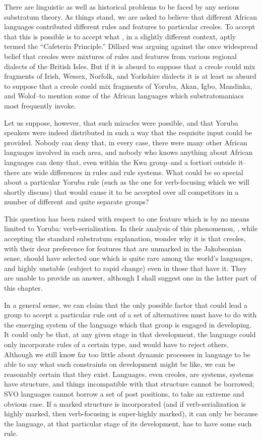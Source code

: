 There are linguistic as well as historical problems to be faced by any serious substratum theory. As things stand, we are asked to believe that different African languages contributed different rules and features to particular creoles. To accept that this is possible is to accept what \citet{Dillard1970}, in a slightly different context, aptly termed the ``Cafe\-teria Principle.'' Dillard was arguing against the once widespread belief that creoles were mixtures of rules and features from various regional dialects of the British Isles. But if it is absurd to suppose that a creole could mix fragments of Irish, Wessex, Norfolk, and Yorkshire dialects it is at least as absurd to suppose that a creole could mix fragments of Yoruba, Akan, Igbo, Mandinka, and Wolof--to mention some of the African languages which substratomaniacs most frequently invoke.

Let us suppose, however, that such miracles were possible, and that Yoruba speakers were indeed distributed in such a way that the
requisite input could be provided. Nobody can deny that, in every case, there were many other African languages involved in each area, and nobody who knows anything about African languages can deny that, even within the Kwa group--and a fortiori outside it--there are wide differences in rules and rule systems. What could be so special about a particular Yoruba rule (such as the one for verb-focusing which we will shortly discuss) that would cause it to be accepted over all compe\-titors in a number of different and quite separate groups?

This question has been raised with respect to one feature which is by no means limited to Yoruba: verb-serialization. In their analysis of this phenomenon, \citet{JansenEtAl1978}, while accepting the standard substratum explanation, wonder why it is that creoles, with their dear preference for features that are unmarked in the Jakobsonian sense, should have selected one which is quite rare among the world's languages, and highly unstable (subject to rapid change) even in those that have it. They are unable to provide an answer, although I shall suggest one in the latter part of this chapter.

In a general sense, we can claim that the only possible factor that could lead a group to accept a particular rule out of a set of alternatives must have to do with the emerging system of the language which that group is engaged in developing. It could only be that, at any given stage in that development, the language could only incorpor\-ate rules of a certain type, and would have to reject others. Although we still know far too little about dynamic processes in language to be able to say what such constraints on development might be like, we can be reasonably certain that they exist. Languages, even creoles, are systems, systems have structure, and things incompatible with that structure cannot be borrowed; SVO languages cannot borrow a set of post positions, to take an extreme and obvious case. If a marked struc\-ture is incorporated (and if verb-serialization is highly marked, then verb-focusing is super-highly marked), it can only be because the language, at that particular stage of its development, has to have some such rule.

